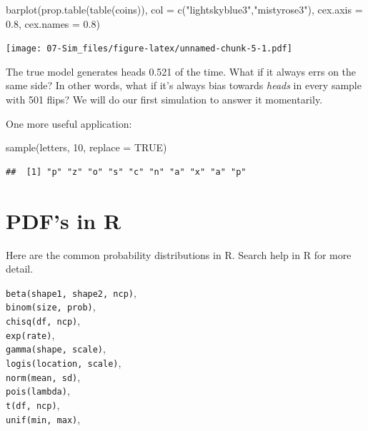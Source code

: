 \documentclass[
]{book}
\newenvironment{Shaded}{\begin{snugshade}}{\end{snugshade}}
\newcommand{\AttributeTok}[1]{\textcolor[rgb]{0.77,0.63,0.00}{#1}}
\newcommand{\ConstantTok}[1]{\textcolor[rgb]{0.00,0.00,0.00}{#1}}
\newcommand{\DecValTok}[1]{\textcolor[rgb]{0.00,0.00,0.81}{#1}}
\newcommand{\FloatTok}[1]{\textcolor[rgb]{0.00,0.00,0.81}{#1}}
\newcommand{\FunctionTok}[1]{\textcolor[rgb]{0.00,0.00,0.00}{#1}}
\newcommand{\NormalTok}[1]{#1}
\newcommand{\StringTok}[1]{\textcolor[rgb]{0.31,0.60,0.02}{#1}}
\begin{document}
\begin{Shaded}
\begin{Highlighting}[]
\FunctionTok{barplot}\NormalTok{(}\FunctionTok{prop.table}\NormalTok{(}\FunctionTok{table}\NormalTok{(coins)), }
        \AttributeTok{col =} \FunctionTok{c}\NormalTok{(}\StringTok{"lightskyblue3"}\NormalTok{,}\StringTok{"mistyrose3"}\NormalTok{),}
        \AttributeTok{cex.axis =} \FloatTok{0.8}\NormalTok{, }\AttributeTok{cex.names =} \FloatTok{0.8}\NormalTok{)}
\end{Highlighting}
\end{Shaded}

\texttt{[image: 07-Sim\_files/figure-latex/unnamed-chunk-5-1.pdf]}

The true model generates heads 0.521 of the time. What if it always errs on the same side? In other words, what if it's always bias towards \emph{heads} in every sample with 501 flips? We will do our first simulation to answer it momentarily.

One more useful application:

\begin{Shaded}
\begin{Highlighting}[]
\FunctionTok{sample}\NormalTok{(letters, }\DecValTok{10}\NormalTok{, }\AttributeTok{replace =} \ConstantTok{TRUE}\NormalTok{)}
\end{Highlighting}
\end{Shaded}

\begin{verbatim}
##  [1] "p" "z" "o" "s" "c" "n" "a" "x" "a" "p"
\end{verbatim}

\hypertarget{pdfs-in-r}{%
\section{PDF's in R}\label{pdfs-in-r}}

Here are the common probability distributions in R. Search help in R for more detail.

\texttt{beta(shape1,\ shape2,\ ncp)},\\
\texttt{binom(size,\ prob)},\\
\texttt{chisq(df,\ ncp)},\\
\texttt{exp(rate)},\\
\texttt{gamma(shape,\ scale)},\\
\texttt{logis(location,\ scale)},\\
\texttt{norm(mean,\ sd)},\\
\texttt{pois(lambda)},\\
\texttt{t(df,\ ncp)},\\
\texttt{unif(min,\ max)},
\end{document}

